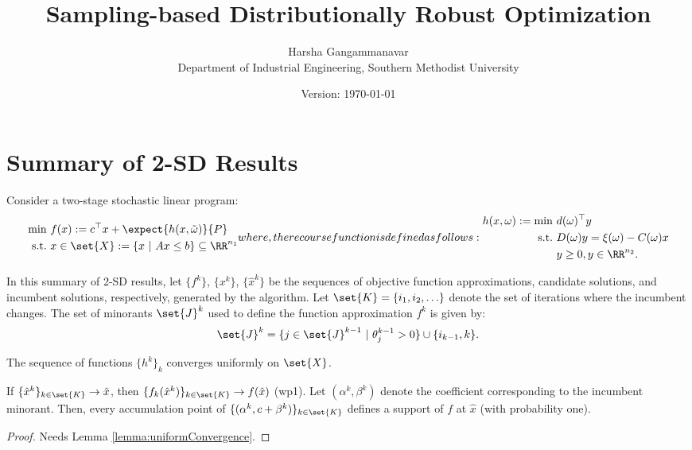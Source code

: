 \documentclass[11pt]{article}
\title{Sampling-based Distributionally Robust Optimization}
\date{Version: \today}
\author{Harsha Gangammanavar\\ Department of Industrial Engineering, Southern Methodist University}
\begin{document}
\maketitle

\section{Summary of 2-SD Results}

Consider a two-stage stochastic linear program:
\begin{subequations} \label{eq:2slp}
\begin{align}\label{eq:2slp_master}
	\min~& f(x) := c^\top x + \expect{h(x,\tilde{\omega})}{P}\\
	\text{s.t.}~& x \in \set{X} := \{x~|~Ax \leq b \} \subseteq \RR^{n_1} \notag 
\end{align}
where, the recourse function is defined as follows:
\begin{align} \label{eq:2slp_subprob}
	h(x,\omega) := \min ~& d(\omega)^\top y \\
				  \text{s.t.}~& D(\omega) y = \xi(\omega) - C(\omega)x \notag \\
				  & y \geq 0, y \in \RR^{n_2}. \notag 
\end{align}
\end{subequations}

In this summary of 2-SD results, let $\{f^k\}$, $\{x^k\}$, $\{\hat{x}^k\}$ be the sequences of objective function approximations, candidate solutions, and incumbent solutions, respectively, generated by the algorithm. Let $\set{K} = \{i_1, i_2,\ldots\}$ denote the set of iterations where the incumbent changes. The set of minorants $\set{J}^k$ used to define the function approximation $f^k$ is given by:
\begin{align}\label{eq:minorantSet}
	\set{J}^k = \{j \in \set{J}^{k-1}~|~ \theta_j^{k-1} > 0\} \cup \{i_{k-1}, k\}. 
\end{align}


\begin{lemma} \label{lemma:uniformConvergence}
The sequence of functions $\{h^k\}_k$ converges uniformly on $\set{X}$.
\end{lemma}

\begin{theorem} \label{thm:asymptoticSupport}
If $\{\hat{x}^k\}_{k \in \set{K}} \rightarrow \hat{x}$, then $\{f_k(\hat{x}^k)\}_{k \in \set{K}} \rightarrow f(\hat{x})$ (wp1). Let $(\alpha^k, \beta^k)$ denote the coefficient corresponding to the incumbent minorant. Then, every accumulation point of $\{(\alpha^k, c + \beta^k)\}_{k \in \set{K}}$ defines a support of $f$ at $\hat{x}$ (with probability one).
\end{theorem}
\begin{proof}
Needs Lemma \ref{lemma:uniformConvergence}.
\end{proof}
\end{document}
